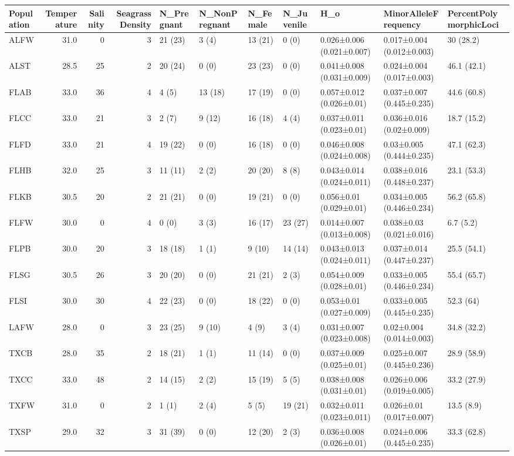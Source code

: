 \documentclass[]{article}
\begin{document}
\begin{longtable}[]{@{}lrrrlllllll@{}}
\toprule
Population & Temperature & Salinity & SeagrassDensity & N\_Pregnant &
N\_NonPregnant & N\_Female & N\_Juvenile & H\_o & MinorAlleleFrequency &
PercentPolymorphicLoci\tabularnewline
\midrule
\endhead
ALFW & 31.0 & 0 & 3 & 21 (23) & 3 (4) & 13 (21) & 0 (0) & 0.026±0.006
(0.021±0.007) & 0.017±0.004 (0.012±0.003) & 30 (28.2)\tabularnewline
ALST & 28.5 & 25 & 2 & 20 (24) & 0 (0) & 23 (23) & 0 (0) & 0.041±0.008
(0.031±0.009) & 0.024±0.004 (0.017±0.003) & 46.1 (42.1)\tabularnewline
FLAB & 33.0 & 36 & 4 & 4 (5) & 13 (18) & 17 (19) & 0 (0) & 0.057±0.012
(0.026±0.01) & 0.037±0.007 (0.445±0.235) & 44.6 (60.8)\tabularnewline
FLCC & 33.0 & 21 & 3 & 2 (7) & 9 (12) & 16 (18) & 4 (4) & 0.037±0.011
(0.023±0.01) & 0.036±0.016 (0.02±0.009) & 18.7 (15.2)\tabularnewline
FLFD & 33.0 & 21 & 4 & 19 (22) & 0 (0) & 16 (18) & 0 (0) & 0.046±0.008
(0.024±0.008) & 0.03±0.005 (0.444±0.235) & 47.1 (62.3)\tabularnewline
FLHB & 32.0 & 25 & 3 & 11 (11) & 2 (2) & 20 (20) & 8 (8) & 0.043±0.014
(0.024±0.011) & 0.038±0.016 (0.448±0.237) & 23.1 (53.3)\tabularnewline
FLKB & 30.5 & 20 & 2 & 21 (21) & 0 (0) & 19 (21) & 0 (0) & 0.056±0.01
(0.029±0.01) & 0.034±0.005 (0.446±0.234) & 56.2 (65.8)\tabularnewline
FLFW & 30.0 & 0 & 4 & 0 (0) & 3 (3) & 16 (17) & 23 (27) & 0.014±0.007
(0.013±0.008) & 0.038±0.03 (0.021±0.016) & 6.7 (5.2)\tabularnewline
FLPB & 30.0 & 20 & 3 & 18 (18) & 1 (1) & 9 (10) & 14 (14) & 0.043±0.013
(0.024±0.011) & 0.037±0.014 (0.447±0.237) & 25.5 (54.1)\tabularnewline
FLSG & 30.5 & 26 & 3 & 20 (20) & 0 (0) & 21 (21) & 2 (3) & 0.054±0.009
(0.028±0.01) & 0.033±0.005 (0.446±0.234) & 55.4 (65.7)\tabularnewline
FLSI & 30.0 & 30 & 4 & 22 (23) & 0 (0) & 18 (22) & 0 (0) & 0.053±0.01
(0.027±0.009) & 0.033±0.005 (0.445±0.235) & 52.3 (64)\tabularnewline
LAFW & 28.0 & 0 & 3 & 23 (25) & 9 (10) & 4 (9) & 3 (4) & 0.031±0.007
(0.023±0.008) & 0.02±0.004 (0.014±0.003) & 34.8 (32.2)\tabularnewline
TXCB & 28.0 & 35 & 2 & 18 (21) & 1 (1) & 11 (14) & 0 (0) & 0.037±0.009
(0.025±0.01) & 0.025±0.007 (0.445±0.236) & 28.9 (58.9)\tabularnewline
TXCC & 33.0 & 48 & 2 & 14 (15) & 2 (2) & 15 (19) & 5 (5) & 0.038±0.008
(0.031±0.01) & 0.026±0.006 (0.019±0.005) & 33.2 (27.9)\tabularnewline
TXFW & 31.0 & 0 & 2 & 1 (1) & 2 (4) & 5 (5) & 19 (21) & 0.032±0.011
(0.023±0.011) & 0.026±0.01 (0.017±0.007) & 13.5 (8.9)\tabularnewline
TXSP & 29.0 & 32 & 3 & 31 (39) & 0 (0) & 12 (20) & 2 (3) & 0.036±0.008
(0.026±0.01) & 0.024±0.006 (0.445±0.235) & 33.3 (62.8)\tabularnewline
\bottomrule
\end{longtable}
\end{document}
